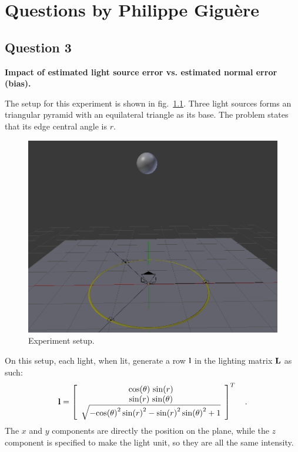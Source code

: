 \documentclass{report}
\begin{document}
\chapter{Questions by Philippe Giguère}

\section{Question 3}

\textbf{Impact of estimated light source error vs. estimated normal error (bias).}

The setup for this experiment is shown in fig.~\ref{q3:setup}. Three light sources forms an triangular pyramid with an equilateral triangle as its base. The problem states that its edge central angle is $r$.

\begin{figure}
  \centering
  \includegraphics[width=0.9\linewidth]{q3_setup.png}
  \caption[Experiment setup]
   {Experiment setup.}
  \label{q3:setup}
\end{figure}

On this setup, each light, when lit, generate a row $\mathbf{l}$ in the lighting matrix $\mathbf{L}$ as such:
\begin{equation}
\B{l} =
\left[\begin{array}{c} \cos\!\left(\theta\right)\, \sin\!\left(r\right) \\ \sin\!\left(r\right)\, \sin\!\left(\theta\right) \\ \sqrt{ - {\cos\!\left(\theta\right)}^2\, {\sin\!\left(r\right)}^2 - {\sin\!\left(r\right)}^2\, {\sin\!\left(\theta\right)}^2 + 1} \end{array}\right]^T
\quad .
\end{equation}
The $x$ and $y$ components are directly the position on the plane, while the $z$ component is specified to make the light unit, so they are all the same intensity.
\end{document}
